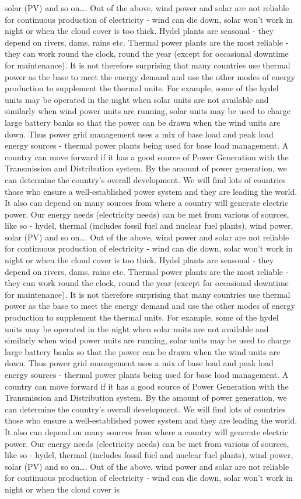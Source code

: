 \documentclass[10pt, a4paper]{article}
\begin{document}
solar (PV) and so on\dots. Out of the above, wind power and solar are not reliable for continuous production of electricity - wind can die down, solar won’t work in night or when the cloud cover is too thick. Hydel plants are seasonal - they depend on rivers, dams, rains etc. Thermal power plants are the most reliable - they can work round the clock, round the year (except for occasional downtime for maintenance). It is not therefore surprising that many countries use thermal power as the base to meet the energy demand and use the other modes of energy production to supplement the thermal units. For example, some of the hydel units may be operated in the night when solar units are not available and similarly when wind power units are running, solar units may be used to charge large battery banks so that the power can be drawn when the wind units are down. Thus power grid management uses a mix of base load and peak load energy sources - thermal power plants being used for base load management. A country can move forward if it has a good source of Power Generation with the Transmission and Distribution system. By the amount of power generation, we can determine the country’s overall development. We will find lots of countries those who ensure a well-established power system and they are leading the world. It also can depend on many sources from where a country will generate electric power. Our energy needs (electricity needs) can be met from various of sources, like so - hydel, thermal (includes fossil fuel and nuclear fuel plants), wind power, solar (PV) and so on\dots. Out of the above, wind power and solar are not reliable for continuous production of electricity - wind can die down, solar won’t work in night or when the cloud cover is too thick. Hydel plants are seasonal - they depend on rivers, dams, rains etc. Thermal power plants are the most reliable - they can work round the clock, round the year (except for occasional downtime for maintenance). It is not therefore surprising that many countries use thermal power as the base to meet the energy demand and use the other modes of energy production to supplement the thermal units. For example, some of the hydel units may be operated in the night when solar units are not available and similarly when wind power units are running, solar units may be used to charge large battery banks so that the power can be drawn when the wind units are down. Thus power grid management uses a mix of base load and peak load energy sources - thermal power plants being used for base load management. A country can move forward if it has a good source of Power Generation with the Transmission and Distribution system. By the amount of power generation, we can determine the country’s overall development. We will find lots of countries those who ensure a well-established power system and they are leading the world. It also can depend on many sources from where a country will generate electric power. Our energy needs (electricity needs) can be met from various of sources, like so - hydel, thermal (includes fossil fuel and nuclear fuel plants), wind power, solar (PV) and so on\dots. Out of the above, wind power and solar are not reliable for continuous production of electricity - wind can die down, solar won’t work in night or when the cloud cover is 
\end{document}
